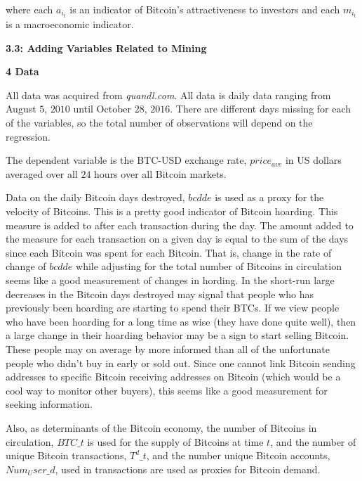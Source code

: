\documentclass{article}[10 pt]
\newcommand{\vs}{\vspace{0.1in}}
\begin{document}
\vs

where each $a_{i_t}$ is an indicator of Bitcoin's attractiveness to
investors and each $m_{i_t}$ is a macroeconomic indicator.

\vs 

\textbf{3.3: Adding Variables Related to Mining}

\vs



\vs

\textbf{4 Data}

\vs

All data was acquired from \textit{quandl.com}. All data is daily data
ranging from August $5$, $2010$ until October $28$, $2016$. There are
different days missing for each of the variables, so the total number of
observations will depend on the regression. 

\vs

The dependent variable is the
BTC-USD exchange rate, $price_{ave}$ in US dollars averaged over all $24$
hours over all Bitcoin markets. 

\vs

Data on the daily Bitcoin days destroyed,
$bcdde$ is used as a proxy for the velocity of Bitcoins. This is a pretty
good indicator of Bitcoin hoarding. This measure is added to after each
transaction during the day. The amount added to the measure for each
transaction on a given day is equal to the sum of the days since each
Bitcoin was spent for each Bitcoin. That is, change in the rate of change of
$bcdde$ while adjusting for the total number of Bitcoins in circulation
seems like a good measurement of changes in hording. In the short-run large
decreases in the Bitcoin days destroyed may signal that people who has
previously been hoarding are starting to spend their BTCs. If we view people
who have been hoarding for a long time as wise (they have done quite well), 
then a large change in their hoarding behavior may be a sign to start
selling Bitcoin. These people may on average by more informed than all of
the unfortunate people who didn't buy in early or sold out. Since one cannot
link Bitcoin sending addresses to specific Bitcoin receiving addresses on
Bitcoin (which would be a cool way to monitor other buyers), this seems
like a good measurement for seeking information.

\vs

Also, as determinants of the Bitcoin economy, the number of Bitcoins in 
circulation, $BTC\_t$ is used for the supply of Bitcoins at time $t$, 
and the number of unique Bitcoin transactions, $T^{d}\_t$, and the number 
unique Bitcoin accounts, $Num_User\_{d}$, used in transactions are used as 
proxies for Bitcoin demand. 
\end{document}
